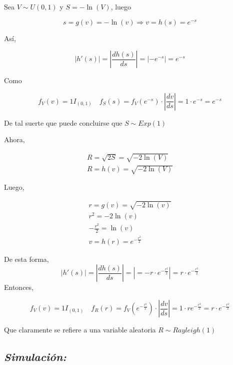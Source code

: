 \documentclass[]{article}
\begin{document}
Sea \(V \sim U(0,1)\) y \(S=-\ln(V)\), luego

\begin{equation}
s=g(v)=-\ln(v)\Rightarrow v=h(s)=e^{-s}
\end{equation}

Así,

\begin{equation}
|h'(s)|=\left| \frac{dh(s)}{ds}  \right|=\left| -e^{-s}  \right|=e^{-s}
\end{equation}

Como

\begin{equation}
f_V(v)=1I_{(0,1)} \quad f_S(s)=f_V(e^{-s})\cdot \left| \frac{dv}{ds}  \right|=1\cdot e^{-s}=e^{-s}
\end{equation}

De tal suerte que puede concluirse que \(S \sim Exp(1)\)

Ahora,

\begin{equation}
\begin{split}
R=\sqrt{2S}=\sqrt{-2\ln(V)}\\
R=h(v)=\sqrt{-2\ln(V)}
\end{split}
\end{equation}

Luego,

\begin{equation}
\begin{split}
r =g(v)= \sqrt{-2\ln(v)}\\
r^2 = -2\ln(v)\\
-\frac{r^2}{2}=\ln(v)\\
v=h(r)=e^{-\frac{r^2}{2}}
\end{split}
\end{equation}

De esta forma, \[
|h'(s)|=\left| \frac{dh(s)}{ds}  \right|=\left| =-r\cdot e^{-\frac{r^2}{2}}  \right|=r\cdot e^{-\frac{r^2}{2}} 
\] \newpage
Entonces,

\[
f_V(v)=1I_{(0,1)} \quad f_R(r)=f_V(e^{-\frac{r^2}{2}})\cdot \left| \frac{dv}{ds}  \right|=1\cdot r e^{-\frac{r^2}{2}}=r\cdot e^{-\frac{r^2}{2}}
\]

Que claramente se refiere a una variable aleatoria \(R\sim Rayleigh(1)\)

\subsection{\texorpdfstring{\emph{Simulación:}}{Simulación:}}\label{simulacion-2}
\end{document}

